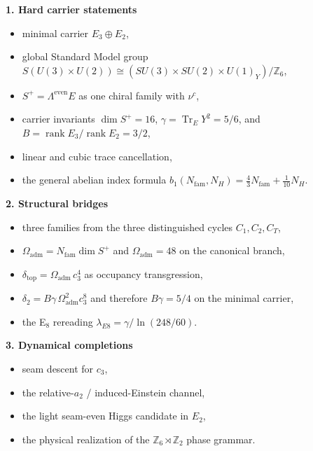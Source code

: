 \documentclass[11pt,a4paper]{article}
\theoremstyle{definition}
\theoremstyle{remark}
\newcommand{\cthree}{c_3}
\newcommand{\deltatop}{\delta_{\mathrm{top}}}
\newcommand{\bone}{b_1}
\newcommand{\tr}{\operatorname{Tr}}
\newcommand{\rank}{\operatorname{rank}}
\newcommand{\Oadm}{\Omega_{\mathrm{adm}}}
\begin{document}
\begin{tcolorbox}[colback=gray!5, colframe=gray!60, breakable,
    title={\textbf{Status boundary for the v2.9 rewrite}}, fonttitle=\bfseries]
\textbf{1. Hard carrier statements}
\begin{itemize}[leftmargin=1.5em, topsep=3pt, itemsep=2pt]
    \item minimal carrier $E_3\oplus E_2$,
    \item global Standard Model group $S(U(3)\times U(2)) \cong (SU(3)\times SU(2)\times U(1)_Y)/\mathbb Z_6$,
    \item $S^+=\Lambda^{\mathrm{even}}E$ as one chiral family with $\nu^c$,
    \item carrier invariants $\dim S^+=16$, $\gamma=\tr_EY^2=5/6$, and $B=\rank E_3/\rank E_2=3/2$,
    \item linear and cubic trace cancellation,
    \item the general abelian index formula $\bone(N_{\mathrm{fam}},N_H)=\frac43 N_{\mathrm{fam}}+\frac1{10}N_H$.
\end{itemize}

\textbf{2. Structural bridges}
\begin{itemize}[leftmargin=1.5em, topsep=3pt, itemsep=2pt]
    \item three families from the three distinguished cycles $C_1,C_2,C_T$,
    \item $\Oadm=N_{\mathrm{fam}}\dim S^+$ and $\Oadm=48$ on the canonical branch,
    \item $\deltatop = \Oadm\,\cthree^4$ as occupancy transgression,
    \item $\delta_2 = B\gamma\,\Oadm^2\cthree^8$ and therefore $B\gamma=5/4$ on the minimal carrier,
    \item the E$_8$ rereading $\lambda_{E8}=\gamma/\ln(248/60)$.
\end{itemize}

\textbf{3. Dynamical completions}
\begin{itemize}[leftmargin=1.5em, topsep=3pt, itemsep=2pt]
    \item seam descent for $\cthree$,
    \item the relative-$a_2$ / induced-Einstein channel,
    \item the light seam-even Higgs candidate in $E_2$,
    \item the physical realization of the $\mathbb Z_6\rtimes \mathbb Z_2$ phase grammar.
\end{itemize}
\end{tcolorbox}
\end{document}
